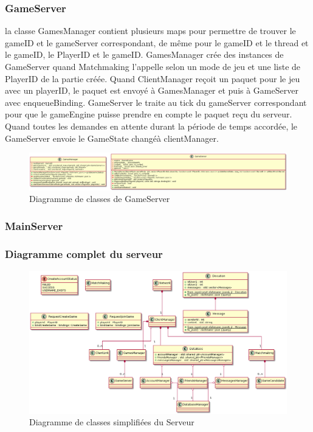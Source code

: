 \documentclass{article}
\begin{document}
\subsubsection{GameServer}

la classe GamesManager contient plusieurs maps pour permettre de trouver le gameID et le gameServer correspondant, de même pour le gameID et le thread et le gameID, le PlayerID et le gameID. GamesManager crée des instances de GameServer quand Matchmaking l'appelle selon un mode de jeu et une liste de PlayerID de la partie créée. Quand ClientManager reçoit un paquet pour le jeu avec un playerID, le paquet est envoyé à GamesManager et puis à GameServer avec enqueueBinding. GameServer le traite au tick du gameServer correspondant pour que le gameEngine puisse prendre en compte le paquet reçu du serveur. Quand toutes les demandes en attente durant la période de temps accordée, le GameServer envoie le GameState changéà clientManager. 

\begin{figure}[H]
	\centering
	 \includegraphics[scale=0.2]{../res/uml/class/GameServerClass.png}
	 \caption{Diagramme de classes de GameServer}
	 \label{fig:GameServerDiagram}
\end{figure}

\subsubsection{MainServer}


\subsubsection{Diagramme complet du serveur}

\begin{figure}[H]
	\centering
	 \includegraphics[scale=0.2]{../res/uml/class/ServerStructureClass.png}
	 \caption{Diagramme de classes  simplifiées du Serveur}
	 \label{fig:WholeServerDiagram}
\end{figure}
\end{document}
